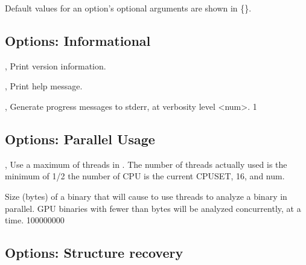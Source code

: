 \documentclass[english]{article}
\begin{document}
Default values for an option's optional arguments are shown in \{\}.

\subsection{Options: Informational}

\begin{Description}

\item[\Opt{-V}, \Opt{--version}]
Print version information.

\item[\Opt{-h}, \Opt{--help}]
Print help message.

\item[\Opt{-v (num)}, \Opt{--verbose (num)}]
Generate progress messages to stderr, at verbosity level <num>. {1}

\end{Description}

\subsection{Options: Parallel Usage}
\item[\OptArg{-j}{num}, \OptArg{--jobs}{num}]
Use a maximum of  threads in .
The number of threads actually used is the minimum of 1/2 the number of CPU is the current CPUSET,
16, and num.

\item[\OptArg{--psize}{n}]
Size (bytes) of a binary that will cause 
to use  threads to analyze a binary in parallel.
GPU binaries with fewer than  bytes will be analyzed
concurrently,  at a time.  {100000000}

\subsection{Options: Structure recovery}
\end{document}
